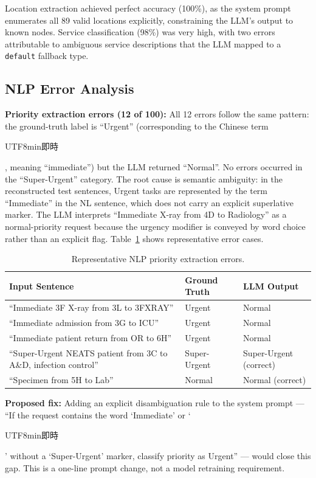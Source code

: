 \documentclass[12pt,a4paper]{article}
\begin{document}
Location extraction achieved perfect accuracy (100\%), as the system prompt enumerates all 89 valid locations explicitly, constraining the LLM's output to known nodes. Service classification (98\%) was very high, with two errors attributable to ambiguous service descriptions that the LLM mapped to a \texttt{default} fallback type.

\subsection{NLP Error Analysis}

\textbf{Priority extraction errors (12 of 100):} All 12 errors follow the same pattern: the ground-truth label is ``Urgent'' (corresponding to the Chinese term \begin{CJK}{UTF8}{min}即時\end{CJK}, meaning ``immediate'') but the LLM returned ``Normal''. No errors occurred in the ``Super-Urgent'' category. The root cause is semantic ambiguity: in the reconstructed test sentences, Urgent tasks are represented by the term ``Immediate'' in the NL sentence, which does not carry an explicit superlative marker. The LLM interprets ``Immediate X-ray from 4D to Radiology'' as a normal-priority request because the urgency modifier is conveyed by word choice rather than an explicit flag. Table~\ref{tab:nlp_errors} shows representative error cases.

\begin{table}[H]
\centering
\caption{Representative NLP priority extraction errors.}
\label{tab:nlp_errors}
\begin{tabular}{p{7.5cm}ll}
\toprule
\textbf{Input Sentence} & \textbf{Ground Truth} & \textbf{LLM Output} \\
\midrule
``Immediate 3F X-ray from 3L to 3FXRAY'' & Urgent & Normal \\
``Immediate admission from 3G to ICU'' & Urgent & Normal \\
``Immediate patient return from OR to 6H'' & Urgent & Normal \\
``Super-Urgent NEATS patient from 3C to A\&D, infection control'' & Super-Urgent & Super-Urgent (correct) \\
``Specimen from 5H to Lab'' & Normal & Normal (correct) \\
\bottomrule
\end{tabular}
\end{table}

\textbf{Proposed fix:} Adding an explicit disambiguation rule to the system prompt --- ``If the request contains the word `Immediate' or `\begin{CJK}{UTF8}{min}即時\end{CJK}' without a `Super-Urgent' marker, classify priority as Urgent'' --- would close this gap. This is a one-line prompt change, not a model retraining requirement.
\end{document}
